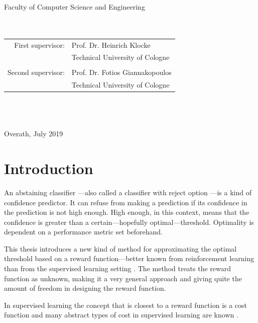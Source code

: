 \documentclass[twoside,11pt]{article}
\begin{document}
\begin{titlepage}
\begin{center}
\begin{large}
Faculty of Computer Science and Engineering
~\\
~\\
~\\
\begin{tabular}{rl}
  First supervisor: &Prof. Dr. Heinrich Klocke\\
                    &Technical University of Cologne\\
  &\\
  Second supervisor: &Prof. Dr. Fotios Giannakopoulos\\
                     &Technical University of Cologne
\end{tabular}
~\\
~\\
~\\
Overath, July 2019
\end{large}
\end{center}
\end{titlepage}



\section{Introduction}

An abstaining classifier
\citep[see e.g.][]{vanderlooy_et_al_2009}---also called a
classifier with reject option
\citep[see e.g.][]{fisher_et_al_2016}---is a kind
of confidence predictor.
It can refuse from making a prediction if its confidence in
the prediction is not high enough.
High enough, in this context, means that the confidence is
greater than a certain---hopefully optimal---threshold.
Optimality is dependent on a performance metric set
beforehand.

This thesis introduces a new kind of method for
approximating the optimal threshold based on a reward
function---better known from reinforcement learning than
from the supervised learning setting
\citep[see e.g.][]{sutton_et_al_2018}.
The method treats the reward function as unknown, making it
a very general approach and giving quite the amount of
freedom in designing the reward function.

In supervised learning the concept that is closest to a
reward function is a cost function and many abstract types
of cost in supervised learning are known
\citep[see][]{turney_2000}.
\end{document}
